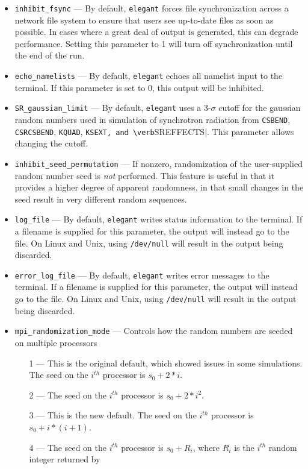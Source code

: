 \documentclass[11pt]{article}
\begin{document}
\begin{itemize}
\item \verb|inhibit_fsync| --- By default, \verb|elegant| forces file synchronization across a network file system
  to ensure that users see up-to-date files as soon as possible.  In cases where a great deal of output is generated,
  this can degrade performance.  Setting this parameter to 1 will turn off synchronization until the end of the run.
\item \verb|echo_namelists| --- By default, \verb|elegant| echoes all namelist input to the terminal.  If this parameter
  is set to 0, this output will be inhibited.
\item \verb|SR_gaussian_limit| --- By default, \verb|elegant| uses a 3-$\sigma$ cutoff for the gaussian random numbers used
  in simulation of synchrotron radiation from \verb|CSBEND|, \verb|CSRCSBEND|, \verb|KQUAD|, \verb|KSEXT, and \verb|SREFFECTS|.
  This parameter allows changing the cutoff.
\item \verb|inhibit_seed_permutation| --- If nonzero, randomization of the user-supplied random number seed is {\em not} performed.
  This feature is useful in that it provides a higher degree of apparent randomness, in that small changes in the seed result
  in very different random sequences.
\item \verb|log_file| --- By default, \verb|elegant| writes status information to the terminal.  If a filename is supplied
  for this parameter, the output will instead go to the file.  On Linux and Unix, using \verb|/dev/null| will result in 
  the output being discarded.
\item \verb|error_log_file| --- By default, \verb|elegant| writes error messages to the terminal.  If a filename is supplied
  for this parameter, the output will instead go to the file.  On Linux and Unix, using \verb|/dev/null| will result in 
  the output being discarded.
\item \verb|mpi_randomization_mode| --- Controls how the random numbers are seeded on multiple processors
  \begin{itemize}
    \item[1] --- This is the original default, which showed issues in some simulations. The seed on the $i^{th}$ processor is $s_0+2*i$.
    \item[2] --- The seed on the $i^{th}$ processor is $s_0+2*i^2$.
    \item[3] --- This is the new default. The seed on the $i^{th}$ processor is $s_0+i*(i+1)$.
    \item[4] --- The seed on the $i^{th}$ processor is $s_0+R_i$, where $R_i$ is the $i^{th}$ random integer returned by

\end{itemize}
\end{itemize}
\end{document}
